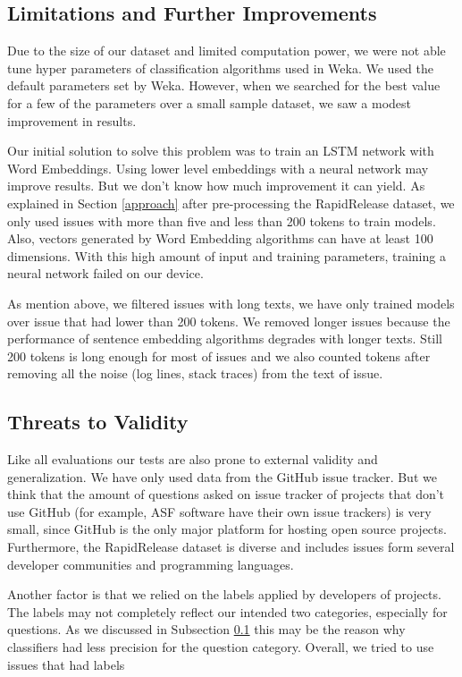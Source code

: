 \documentclass[conference]{IEEEtran}
\begin{document}
\subsection{Limitations and Further Improvements}
\label{limits}
Due to the size of our dataset and limited computation power, we were not able tune hyper parameters of 
classification algorithms used in Weka. We used the default parameters set by Weka. 
However, when we searched for the best value for a few of the parameters over a small sample dataset,
we saw a modest improvement in results.

Our initial solution to solve this problem was to train an LSTM network with Word Embeddings. Using lower level 
embeddings with a neural network may improve results. But we don't know how much improvement it can yield.
As explained in Section \ref{approach} after pre-processing the RapidRelease dataset, we only used issues with 
more than five and less than 200 tokens to train models. Also, vectors generated by Word Embedding algorithms 
can have at least 100 dimensions. With this high amount of input and training parameters, training a neural network 
failed on our device. 

As mention above, we filtered issues with long texts, we have only trained models over issue that had lower than 200 
tokens. We removed longer issues because the performance of sentence embedding algorithms degrades 
with longer texts. Still 200 tokens is long enough for most of issues and we also counted tokens after 
removing all the noise (log lines, stack traces) from the text of issue.

\subsection{Threats to Validity}
Like all evaluations our tests are also prone to external validity and generalization. We have only used data from 
the GitHub issue tracker. But we think that the amount of questions asked on issue tracker of projects that don't 
use GitHub (for example, ASF software have their own issue trackers) is very small, since GitHub is the only major 
platform for hosting open source projects. Furthermore, the RapidRelease dataset is diverse and includes issues 
form several developer communities and programming languages. 

Another factor is that we relied on the labels applied by developers of projects. The labels may not completely 
reflect our intended two categories, especially for questions. As we discussed in Subsection \ref{limits} this 
may be the reason why classifiers had less precision for the question category. Overall, we tried to use issues 
that had labels 
\end{document}
